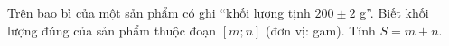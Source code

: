 \begin{ex}
Trên bao bì của một sản phẩm có ghi ``khối lượng tịnh $200\pm2$ g''. Biết khối lượng đúng của sản phẩm thuộc đoạn $[m;n]$ (đơn vị: gam). Tính $S=m+n$.
\end{ex}
